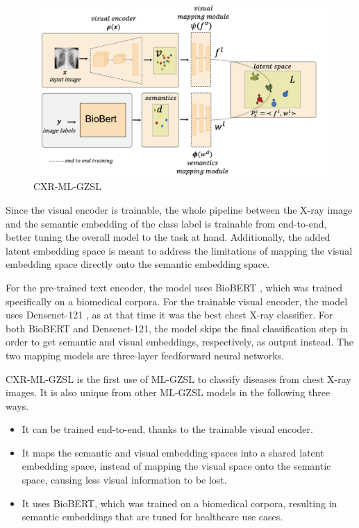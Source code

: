\documentclass[letterpaper]{article} %
\begin{document}
\begin{figure}[h!]
\centering
\includegraphics[width=0.9\columnwidth]{model.png}
\caption{CXR-ML-GZSL \cite{hayat2021multilabel}}
\label{fig:model}
\end{figure}

Since the visual encoder is trainable, the whole pipeline between the X-ray image and the semantic embedding of the class label is trainable from end-to-end, better tuning the overall model to the task at hand. Additionally, the added latent embedding space is meant to address the limitations of mapping the visual embedding space directly onto the semantic embedding space.

For the pre-trained text encoder, the model uses BioBERT \cite{10.1093/bioinformatics/btz682}, which was trained specifically on a biomedical corpora. For the trainable visual encoder, the model uses Densenet-121 \cite{rajpurkar2017chexnetradiologistlevelpneumoniadetection}, as at that time it was the best chest X-ray classifier. For both BioBERT and Densenet-121, the model skips the final classification step in order to get semantic and visual embeddings, respectively, as output instead. The two mapping models are three-layer feedforward neural networks.

CXR-ML-GZSL is the first use of ML-GZSL to classify diseases from chest X-ray images. It is also unique from other ML-GZSL models in the following three ways.

\begin{itemize}
    \item It can be trained end-to-end, thanks to the trainable visual encoder.
    \item It maps the semantic and visual embedding spaces into a shared latent embedding space, instead of mapping the visual space onto the semantic space, causing less visual information to be lost.
    \item It uses BioBERT, which was trained on a biomedical corpora, resulting in semantic embeddings that are tuned for healthcare use cases.
\end{itemize}
\end{document}
